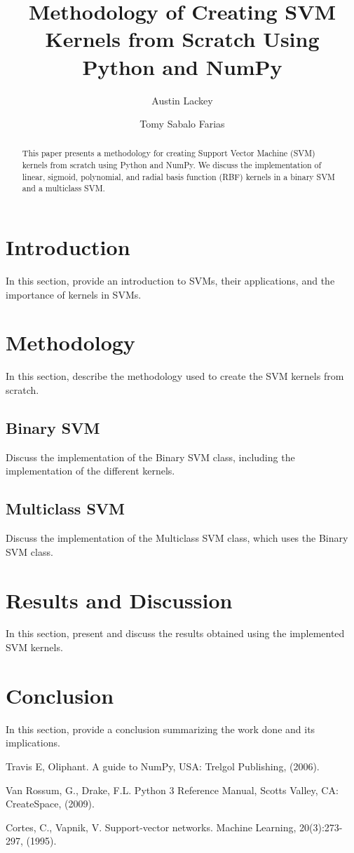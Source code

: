 \documentclass[12pt]{article}
\title{Methodology of Creating SVM Kernels from Scratch Using Python and NumPy}
\author[1]{Austin Lackey}
\author[2]{Tomy Sabalo Farias}
\affil[1]{DSCI 320, Colorado State University}
\affil[2]{DSCI 320, Colorado State University}
\begin{document}
\maketitle

\begin{abstract}
This paper presents a methodology for creating Support Vector Machine (SVM) kernels from scratch using Python and NumPy. We discuss the implementation of linear, sigmoid, polynomial, and radial basis function (RBF) kernels in a binary SVM and a multiclass SVM.
\end{abstract}

\section{Introduction}
In this section, provide an introduction to SVMs, their applications, and the importance of kernels in SVMs.

\section{Methodology}
In this section, describe the methodology used to create the SVM kernels from scratch.

\subsection{Binary SVM}
Discuss the implementation of the Binary SVM class, including the implementation of the different kernels.

\subsection{Multiclass SVM}
Discuss the implementation of the Multiclass SVM class, which uses the Binary SVM class.

\section{Results and Discussion}
In this section, present and discuss the results obtained using the implemented SVM kernels.

\section{Conclusion}
In this section, provide a conclusion summarizing the work done and its implications.

\begin{thebibliography}{9}
Travis E, Oliphant. 
A guide to NumPy, USA: Trelgol Publishing, (2006).

Van Rossum, G., Drake, F.L. 
Python 3 Reference Manual, Scotts Valley, CA: CreateSpace, (2009).

Cortes, C., Vapnik, V. 
Support-vector networks. Machine Learning, 20(3):273-297, (1995).
\end{thebibliography}
\end{document}
